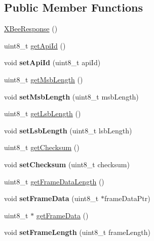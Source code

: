 \subsection*{\-Public \-Member \-Functions}
\begin{DoxyCompactItemize}
\item 
\hyperlink{classXBeeResponse_a03a6ea7651a40062c22ca0a37fbf512f}{\-X\-Bee\-Response} ()
\item 
uint8\-\_\-t \hyperlink{classXBeeResponse_a4a9677e3b39054119fa278d1ad52130a}{get\-Api\-Id} ()
\item 
\hypertarget{classXBeeResponse_a68177a43b06ba96b901759a491aae073}{void {\bfseries set\-Api\-Id} (uint8\-\_\-t api\-Id)}\label{classXBeeResponse_a68177a43b06ba96b901759a491aae073}

\item 
uint8\-\_\-t \hyperlink{classXBeeResponse_aae9f85f70cbcb92cfcc278295a947952}{get\-Msb\-Length} ()
\item 
\hypertarget{classXBeeResponse_a9aa50d1df15ff44b24ffb299854dba74}{void {\bfseries set\-Msb\-Length} (uint8\-\_\-t msb\-Length)}\label{classXBeeResponse_a9aa50d1df15ff44b24ffb299854dba74}

\item 
uint8\-\_\-t \hyperlink{classXBeeResponse_acb1b40edafa22461776b75bd5d7caadf}{get\-Lsb\-Length} ()
\item 
\hypertarget{classXBeeResponse_a796fd65123825128715e51e6300e9e58}{void {\bfseries set\-Lsb\-Length} (uint8\-\_\-t lsb\-Length)}\label{classXBeeResponse_a796fd65123825128715e51e6300e9e58}

\item 
uint8\-\_\-t \hyperlink{classXBeeResponse_aa8f34253bb77196366ea8ac9bc318734}{get\-Checksum} ()
\item 
\hypertarget{classXBeeResponse_af69cfaa7c99e6aab2236c8f11ab07940}{void {\bfseries set\-Checksum} (uint8\-\_\-t checksum)}\label{classXBeeResponse_af69cfaa7c99e6aab2236c8f11ab07940}

\item 
uint8\-\_\-t \hyperlink{classXBeeResponse_a6205be340c4f0397a68dadbdca36a091}{get\-Frame\-Data\-Length} ()
\item 
\hypertarget{classXBeeResponse_a13788c12c5201769a304880335749b69}{void {\bfseries set\-Frame\-Data} (uint8\-\_\-t $\ast$frame\-Data\-Ptr)}\label{classXBeeResponse_a13788c12c5201769a304880335749b69}

\item 
uint8\-\_\-t $\ast$ \hyperlink{classXBeeResponse_ad958f0b5200138545bdd762111299a94}{get\-Frame\-Data} ()
\item 
\hypertarget{classXBeeResponse_ad2419bab7589e82b5358482c1abbe87c}{void {\bfseries set\-Frame\-Length} (uint8\-\_\-t frame\-Length)}\label{classXBeeResponse_ad2419bab7589e82b5358482c1abbe87c}


\end{DoxyCompactItemize}

